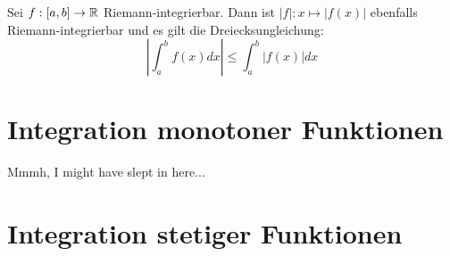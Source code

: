 \documentclass[main.tex]{subfiles}
\begin{document}
\begin{Theorem}
  Sei $f:[a,b] \to \mathbb{R}$ Riemann-integrierbar. Dann ist $|f|:x \mapsto |f(x)|$ ebenfalls Riemann-integrierbar und es gilt die Dreiecksungleichung:
  $$\left | \int_a^b f(x)dx \right| \leq \int_a^b |f(x)|dx$$
\end{Theorem}


\section{Integration monotoner Funktionen}

Mmmh, I might have slept in here...


\section{Integration stetiger Funktionen}
\end{document}
